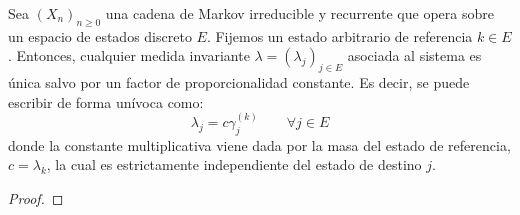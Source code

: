 \begin{teo}
    Sea $(X_n)_{n \geq 0}$ una cadena de Markov irreducible y recurrente que opera sobre un espacio de estados discreto $E$. Fijemos un estado arbitrario de referencia $k \in E$. Entonces, cualquier medida invariante $\lambda = (\lambda_j)_{j \in E}$ asociada al sistema es única salvo por un factor de proporcionalidad constante. Es decir, se puede escribir de forma unívoca como:
    \[ 
    \lambda_j = c \gamma_j^{(k)} \qquad \forall j \in E 
    \]
    donde la constante multiplicativa viene dada por la masa del estado de referencia, $c = \lambda_k$, la cual es estrictamente independiente del estado de destino $j$.

\begin{proof}




\end{proof}
\end{teo}
